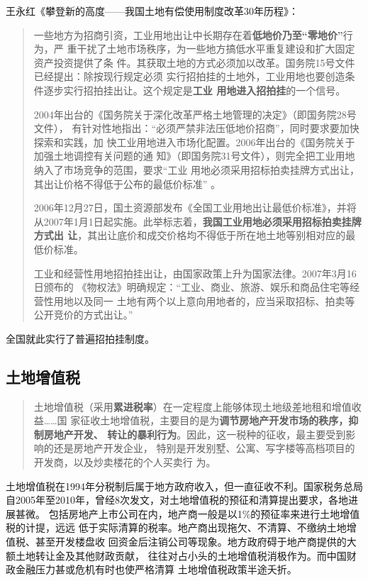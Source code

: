 王永红《攀登新的高度——我国土地有偿使用制度改革30年历程》：
\begin{quotation}
  一些地方为招商引资，工业用地出让中长期存在着\textbf{低地价乃至“零地价”}行为，严
  重干扰了土地市场秩序，为一些地方搞低水平重复建设和扩大固定资产投资提供了条
  件。其获取土地的方式必须加以改革。国务院15号文件已经提出：除按现行规定必须
  实行招拍挂的土地外，工业用地也要创造条件逐步实行招拍挂出让。这个规定是\textbf{工业
  用地进入招拍挂}的一个信号。

  2004年出台的《国务院关于深化改革严格土地管理的决定》（即国务院28号文件），
  有针对性地指出：“必须严禁非法压低地价招商”，同时要求要加快探索和实践，加
  快工业用地进入市场化配置。2006年出台的《国务院关于加强土地调控有关问题的通
  知》（即国务院31号文件），则完全把工业用地纳入了市场竞争的范围，要求“工业
  用地必须采用招标拍卖挂牌方式出让，其出让价格不得低于公布的最低价标准” 。

  2006年12月27日，国土资源部发布《全国工业用地出让最低价标准》，并将
  从2007年1月1日起实施。此举标志着，\textbf{我国工业用地必须采用招标拍卖挂牌方式出
    让}，其出让底价和成交价格均不得低于所在地土地等别相对应的最低价标准。

  工业和经营性用地招拍挂出让，由国家政策上升为国家法律。2007年3月16日颁布的
  《物权法》明确规定：“工业、商业、旅游、娱乐和商品住宅等经营性用地以及同一
  土地有两个以上意向用地者的，应当采取招标、拍卖等公开竞价的方式出让。”
\end{quotation}

全国就此实行了普遍招拍挂制度。

\subsection{土地增值税}

\begin{quotation}
  土地增值税（采用\textbf{累进税率}）在一定程度上能够体现土地级差地租和增值收益……国
  家征收土地增值税，主要目的是为\textbf{调节房地产开发市场的秩序，抑制房地产开发、
    转让的暴利行为}。因此，这一税种的征收，最主要受到影响的还是房地产开发企业，
  特别是开发别墅、公寓、写字楼等高档项目的开发商，以及炒卖楼花的个人买卖行
  为。\cite{yangdi}
\end{quotation}

土地增值税在1994年分税制后属于地方政府收入，但一直征收不利。国家税务总局
自2005年至2010年，曾经8次发文，对土地增值税的预征和清算提出要求，各地进展甚微。
包括房地产上市公司在内，地产商一般是以1\%的预征率来进行土地增值税的计提，远远
低于实际清算的税率。地产商出现拖欠、不清算、不缴纳土地增值税、甚至开发楼盘收
回资金后注销公司等现象。地方政府碍于地产商提供的大额土地转让金及其他财政贡献，
往往对占小头的土地增值税消极作为。而中国财政金融压力甚或危机有时也使严格清算
土地增值税政策半途夭折。

